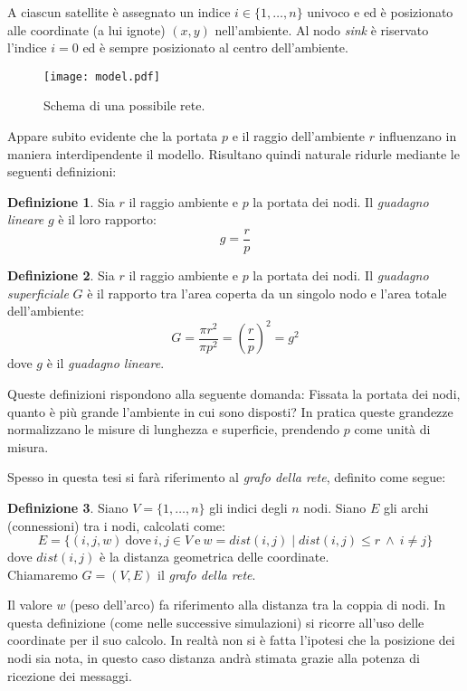 \documentclass[a4paper,12pt]{article}
\theoremstyle{definition}
\newtheorem{definition}{Definizione}
\begin{document}
A ciascun satellite è assegnato un indice $i \in \{1, \dots, n\}$ univoco e ed è posizionato alle coordinate (a lui ignote) $(x, y)$ nell'ambiente. Al nodo \emph{sink} è riservato l'indice $i = 0$ ed è sempre posizionato al centro dell'ambiente.

\begin{figure}[h]
\centering
\texttt{[image: model.pdf]}
\caption{Schema di una possibile rete.}
\end{figure}

Appare subito evidente che la portata $p$ e il raggio dell'ambiente $r$ influenzano in maniera interdipendente il modello. Risultano quindi naturale ridurle mediante le seguenti definizioni:

\begin{definition}
Sia $r$ il raggio ambiente e $p$ la portata dei nodi. Il \emph{guadagno lineare} $g$ è il loro rapporto:
$$ g = \frac{r}{p} $$
\end{definition}

\begin{definition}
Sia $r$ il raggio ambiente e $p$ la portata dei nodi. Il \emph{guadagno superficiale} $G$ è il rapporto tra l'area coperta da un singolo nodo e l'area totale dell'ambiente:
$$ G = \frac{\pi r^2}{\pi p^2} = \left(\frac{r}{p}\right)^2 = g^2 $$
dove $g$ è il \emph{guadagno lineare}.
\end{definition}

Queste definizioni rispondono alla seguente domanda: Fissata la portata dei nodi, quanto è più grande l'ambiente in cui sono disposti? In pratica queste grandezze normalizzano le misure di lunghezza e superficie, prendendo $p$ come unità di misura.

Spesso in questa tesi si farà riferimento al \emph{grafo della rete}, definito come segue:

\begin{definition}
Siano $V = \{1, \dots, n \}$ gli indici degli $n$ nodi. Siano $E$ gli archi (connessioni) tra i nodi, calcolati come:
$$ E = \{ (i, j, w) \ \text{dove} \ i, j \in V \ \text{e} \ w = dist(i, j) \mid dist(i, j) \le r \ \wedge \ i \neq j\} $$
dove $dist(i, j)$ è la distanza geometrica delle coordinate.\\
Chiamaremo $G = (V, E)$ il \emph{grafo della rete}.
\end{definition}

Il valore $w$ (peso dell'arco) fa riferimento alla distanza tra la coppia di nodi.
In questa definizione (come nelle successive simulazioni) si ricorre all'uso delle coordinate per il suo calcolo. In realtà non si è fatta l'ipotesi che la posizione dei nodi sia nota, in questo caso distanza andrà stimata grazie alla potenza di ricezione dei messaggi.
\end{document}

